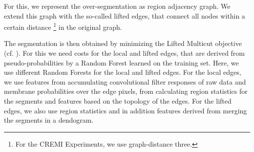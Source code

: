 \documentclass[runningheads,a4paper]{llncs}
\begin{document}
For this, we represent the over-segmentation as region adjacency graph. We extend this graph with the so-called lifted edges, that connect all nodes within a certain distance \footnote{For the CREMI Experiments, we use graph-distance three.} in the original graph.

The segmentation is then obtained by minimizing the Lifted Multicut objective (cf. \cite{keuper2015efficient}).
For this we need costs for the local and lifted edges, that are derived from pseudo-probabilities by a Random Forest learned on the training set.
Here, we use different Random Forests for the local and lifted edges.
For the local edges, we use features from accumulating convolutional filter responses of raw data and membrane probabilities over the edge pixels, from calculating region statistics for the segments and features based on the topology of the edges.
For the lifted edges, we also use region statistics and in addition features derived from merging the segments in a dendogram.




\end{document}
